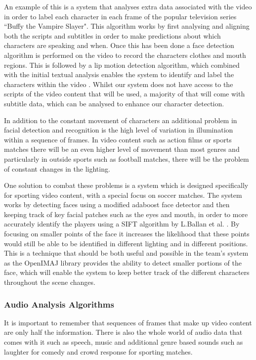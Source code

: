An example of this is a system that analyses extra data associated with the video in order to label each character in each frame of the popular television series ``Buffy the Vampire Slayer". This algorithm works by first analysing and aligning both the scripts and subtitles in order to make predictions about which characters are speaking and when. Once this has been done a face detection algorithm is performed on the video to record the characters clothes and mouth regions. This is followed by a lip motion detection algorithm, which combined with the initial textual analysis enables the system to identify and label the characters within the video \cite{buffy}. Whilst our system does not have access to the scripts of the video content that will be used, a majority of that will come with subtitle data, which can be analysed to enhance our character detection. 

In addition to the constant movement of characters an additional problem in facial detection and recognition is the high level of variation 
in illumination within a sequence of frames. In video content such as action films or sports matches there will be an even higher level of 
movement than most genres and particularly in outside sports such as football matches, there will be the problem of constant changes in the 
lighting. 

One solution to combat these problems is a system which is designed specifically for sporting video content, with a special focus on soccer matches. 
The system works by detecting faces using a modified adaboost face detector and then keeping track of key facial patches such as the eyes and 
mouth, in order to more accurately identify the players using a SIFT algorithm by L.Ballan et al. \cite{football}. By focusing on smaller points of the face 
it increases the likelihood that these points would still be able to be identified in different lighting and in different positions. This is 
a technique that should be both useful and possible in the team's system as the OpenIMAJ library provides the ability to detect smaller 
portions of the face, which will enable the system to keep better track of the different characters throughout the scene changes. 

\subsubsection{Audio Analysis Algorithms}
\label{sec:AudioAnalysis}
It is important to remember that sequences of frames that make up video content are only half the information. There is also the whole world 
of audio data that comes with it such as speech, music and additional genre based sounds such as laughter for comedy and crowd response for 
sporting matches. 

